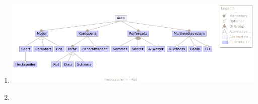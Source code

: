 \documentclass[11pt, a4paper]{article}
\begin{document}
    \section{}
        \begin{enumerate}
            \item
                \begin{centering}
                    \includegraphics[width=\linewidth]{assets/Variantenmanagement}
                \end{centering}
            \pagebreak
            \item
                

                
        \end{enumerate}
\end{document}
